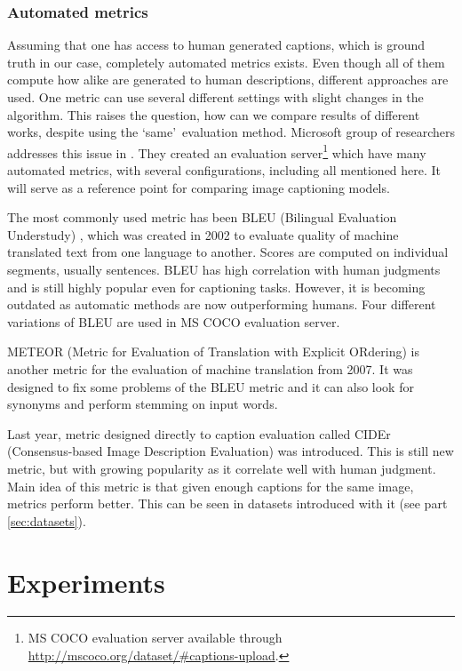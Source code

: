 		\subsection{Automated metrics}
		
Assuming that one has access to human generated captions, which is ground truth in our case, completely automated metrics exists. Even though all of them compute how alike are generated to human descriptions, different approaches are used. One metric can use several different settings with slight changes in the algorithm. This raises the question, how can we compare results of different works, despite using the \textquoteleft same\textquoteright \ evaluation method. Microsoft group of researchers addresses this issue in \cite{DBLP:journals/corr/ChenFLVGDZ15}. They created an evaluation server\footnote{MS COCO evaluation server available through \url{http://mscoco.org/dataset/\#captions-upload}.} which have many automated metrics, with several configurations, including all mentioned here. It will serve as a reference point for comparing image captioning models.
		
The most commonly used metric has been BLEU (Bilingual Evaluation Understudy) \cite{Papineni:2002:BMA:1073083.1073135}, which was created in 2002 to evaluate quality of machine translated text from one language to another. Scores are computed on individual segments, usually sentences. BLEU has high correlation with human judgments and is still highly popular even for captioning tasks. However, it is becoming outdated as automatic methods are now outperforming humans. Four different variations of BLEU are used in MS COCO evaluation server.

METEOR (Metric for Evaluation of Translation with Explicit ORdering) \cite{Lavie:2007:MAM:1626355.1626389} is another metric for the evaluation of machine translation from 2007. It was designed to fix some problems of the BLEU metric and it can also look for synonyms and perform stemming on input words.
		
Last year, metric designed directly to caption evaluation called CIDEr (Consensus-based Image Description Evaluation) \cite{Vedantam_2015_CVPR} was introduced. This is still new metric, but with growing popularity as it correlate well with human judgment. Main idea of this metric is that given enough captions for the same image, metrics perform better. This can be seen in datasets introduced with it (see part \ref{sec:datasets}).		

\chapter{Experiments}

